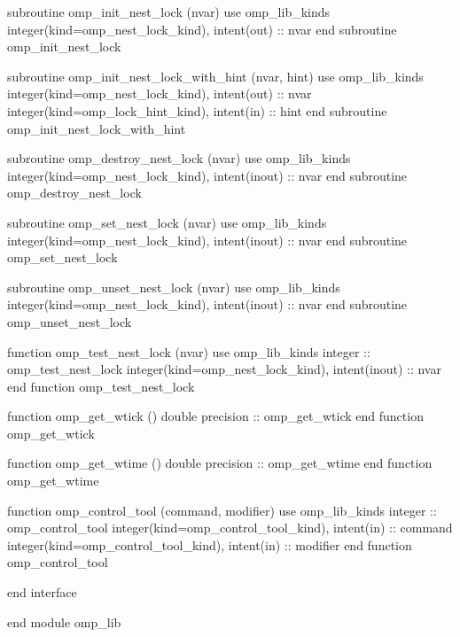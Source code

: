 {\begin{codepar}
          subroutine omp\_init\_nest\_lock (nvar)
           use omp\_lib\_kinds
           integer(kind=omp\_nest\_lock\_kind), intent(out) :: nvar
          end subroutine omp\_init\_nest\_lock

          subroutine omp\_init\_nest\_lock\_with\_hint (nvar, hint)
           use omp\_lib\_kinds
           integer(kind=omp\_nest\_lock\_kind), intent(out) :: nvar
           integer(kind=omp\_lock\_hint\_kind), intent(in) :: hint
          end subroutine omp\_init\_nest\_lock\_with\_hint

          subroutine omp\_destroy\_nest\_lock (nvar)
           use omp\_lib\_kinds
           integer(kind=omp\_nest\_lock\_kind), intent(inout) :: nvar
          end subroutine omp\_destroy\_nest\_lock

          subroutine omp\_set\_nest\_lock (nvar)
           use omp\_lib\_kinds
           integer(kind=omp\_nest\_lock\_kind), intent(inout) :: nvar
          end subroutine omp\_set\_nest\_lock

          subroutine omp\_unset\_nest\_lock (nvar)
           use omp\_lib\_kinds
           integer(kind=omp\_nest\_lock\_kind), intent(inout) :: nvar
          end subroutine omp\_unset\_nest\_lock

          function omp\_test\_nest\_lock (nvar)
           use omp\_lib\_kinds
           integer :: omp\_test\_nest\_lock
           integer(kind=omp\_nest\_lock\_kind), intent(inout) :: nvar
          end function omp\_test\_nest\_lock

          function omp\_get\_wtick ()
           double precision :: omp\_get\_wtick
          end function omp\_get\_wtick

          function omp\_get\_wtime ()
           double precision :: omp\_get\_wtime
          end function omp\_get\_wtime
\begin{samepage}
          function omp\_control\_tool (command, modifier)
           use omp\_lib\_kinds
           integer :: omp\_control\_tool 
           integer(kind=omp\_control\_tool\_kind), intent(in) :: command
           integer(kind=omp\_control\_tool\_kind), intent(in) :: modifier
          end function omp\_control\_tool
\end{samepage}
          end interface

        end module omp\_lib
\end{codepar}} %






\pagebreak
